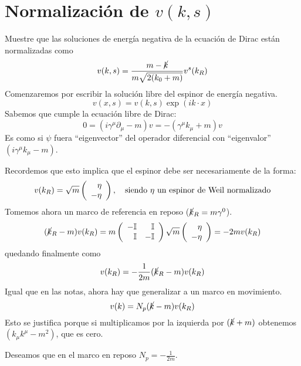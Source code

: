 \section{Normalización de $v(k,s)$}
\begingroup\color{blue}
Muestre que las soluciones de energía negativa de la ecuación de Dirac están normalizadas como
\begin{equation}
v(k,s)=\frac{m-\cancel k}{m\sqrt{2(k_0+m)}}v^s(k_R)
\end{equation}
\endgroup
Comenzaremos por escribir la solución libre del espinor de energía negativa.
\begin{equation*}
v(x,s)=v(k,s)\exp(ik\cdot x)
\end{equation*}
Sabemos que cumple la ecuación libre de Dirac:
\begin{equation}
0=(i\gamma^\mu\partial_\mu-m)v
=-(\gamma^\mu k_\mu + m)v
\end{equation}
Es como si $\psi$ fuera ``eigenvector'' del operador diferencial con ``eigenvalor'' $(i\gamma^\mu k_\mu-m)$.
\par Recordemos que esto implica que el espinor debe ser necesariamente de la forma:
\begin{equation}
v(k_R)=\sqrt m\left(\begin{array}r
\eta\\-\eta
\end{array}\right),
\quad\text{siendo $\eta$ un espinor de Weil normalizado}
\end{equation}
Tomemos ahora un marco de referencia en reposo ($\cancel k_R = m\gamma^0$).
\begin{equation}
(\cancel k_R-m)v(k_R)=
m\left(\begin{array}{rr}
-\mathbb I&\mathbb I\\
\mathbb I&-\mathbb I
\end{array}\right)
\sqrt m\left(\begin{array}{r}
\eta\\
-\eta
\end{array}\right)
=-2mv(k_R)
\end{equation}
quedando finalmente como
\begin{equation}
v(k_R)=-\frac1{2m}(\cancel k_R-m)v(k_R)
\end{equation}
Igual que en las notas, ahora hay que generalizar a un marco en movimiento.
\begin{equation}
v(k)=N_p(\cancel k-m)v(k_R)
\end{equation}
Esto se justifica porque si multiplicamos por la izquierda por $(\cancel k+m)$ obtenemos $(k_\mu k^\mu-m^2)$, que es cero.
\par Deseamos que en el marco en reposo $N_p=-\frac1{2m}$. 
